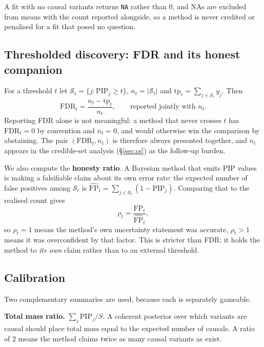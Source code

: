 \documentclass[11pt,a4paper]{article}
\newcommand{\pip}{\mathrm{PIP}}
\begin{document}
A fit with no causal variants returns \texttt{NA} rather than $0$, and NAs are
excluded from means with the count reported alongside, so a method is never
credited or penalised for a fit that posed no question.

\subsection{Thresholded discovery: FDR and its honest companion}\label{sec:fdr}

For a threshold $t$ let $\mathcal{S}_t=\{j:\pip_j\ge t\}$, $n_t=|\mathcal{S}_t|$
and $\mathrm{tp}_t=\sum_{j\in\mathcal{S}_t}y_j$. Then
\begin{equation}
\mathrm{FDR}_t=\frac{n_t-\mathrm{tp}_t}{n_t},\qquad
\text{reported jointly with } n_t .
\end{equation}
Reporting FDR alone is not meaningful: a method that never crosses $t$ has
$\mathrm{FDR}_t=0$ by convention and $n_t=0$, and would otherwise win the
comparison by abstaining. The pair $(\mathrm{FDR}_t,n_t)$ is therefore always
presented together, and $n_t$ appears in the credible-set analysis
(\S\ref{sec:cs}) as the follow-up burden.

We also compute the \textbf{honesty ratio}. A Bayesian method that emits $\pip$
values is making a falsifiable claim about its own error rate: the expected
number of false positives among $\mathcal{S}_t$ is
$\widehat{\mathrm{FP}}_t=\sum_{j\in\mathcal{S}_t}(1-\pip_j)$. Comparing that to
the realised count gives
\begin{equation}
\rho_t=\frac{\mathrm{FP}_t}{\widehat{\mathrm{FP}}_t},
\end{equation}
so $\rho_t=1$ means the method's own uncertainty statement was accurate,
$\rho_t>1$ means it was overconfident by that factor. This is stricter than
FDR: it holds the method to \emph{its own} claim rather than to an external
threshold.

\subsection{Calibration}\label{sec:calibmethod}

Two complementary summaries are used, because each is separately gameable.

\textbf{Total mass ratio.} $\sum_j \pip_j / S$. A coherent posterior over which
variants are causal should place total mass equal to the expected number of
causals. A ratio of $2$ means the method claims twice as many causal variants
as exist.
\end{document}
